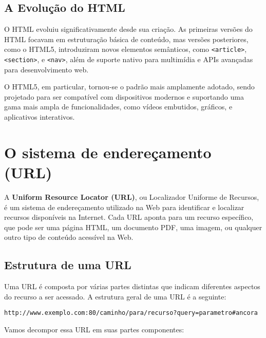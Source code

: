 \subsection{A Evolução do HTML}

O HTML evoluiu significativamente desde sua criação. As primeiras versões do HTML focavam em estruturação básica de conteúdo, mas versões posteriores, como o HTML5, introduziram novos elementos semânticos, como \texttt{<article>}, \texttt{<section>}, e \texttt{<nav>}, além de suporte nativo para multimídia e APIs avançadas para desenvolvimento web.

O HTML5, em particular, tornou-se o padrão mais amplamente adotado, sendo projetado para ser compatível com dispositivos modernos e suportando uma gama mais ampla de funcionalidades, como vídeos embutidos, gráficos, e aplicativos interativos.

\section{O sistema de endereçamento (URL)}

A \textbf{Uniform Resource Locator (URL)}, ou Localizador Uniforme de Recursos, é um sistema de endereçamento utilizado na Web para identificar e localizar recursos disponíveis na Internet. Cada URL aponta para um recurso específico, que pode ser uma página HTML, um documento PDF, uma imagem, ou qualquer outro tipo de conteúdo acessível na Web.

\subsection{Estrutura de uma URL}
Uma URL é composta por várias partes distintas que indicam diferentes aspectos do recurso a ser acessado. A estrutura geral de uma URL é a seguinte:

\scriptsize
\begin{verbatim}
http://www.exemplo.com:80/caminho/para/recurso?query=parametro#ancora
\end{verbatim}
\normalsize

Vamos decompor essa URL em suas partes componentes:

